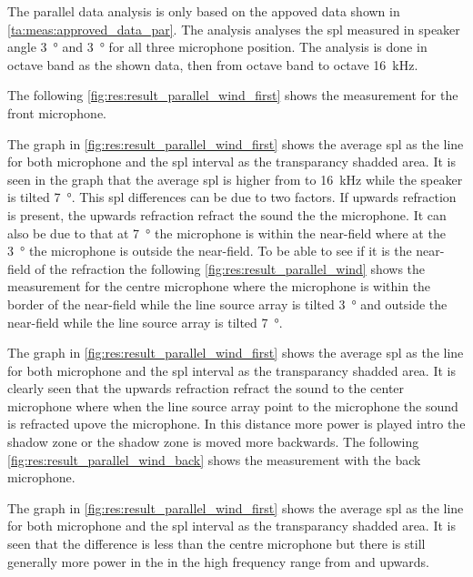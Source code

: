 The parallel data analysis is only based on the appoved data shown in \autoref{ta:meas:approved_data_par}. The analysis analyses the \gls{spl} measured in speaker angle \SI{3}{\degree} and  \SI{3}{\degree} for all three microphone position. The analysis is done in octave band as the shown data, then from octave band  to octave \SI{16}{\kilo\hertz}. 

 The following \autoref{fig:res:result_parallel_wind_first}  shows the measurement for the front microphone.

  
The graph in \autoref{fig:res:result_parallel_wind_first} shows the average \gls{spl} as the line for both microphone and the \gls{spl} interval as the transparancy shadded area.
It is seen in the graph that the average \gls{spl} is higher from  to \SI{16}{\kilo\hertz} while the speaker is tilted \SI{7}{\degree}. This \gls{spl} differences can be due to two factors. If upwards refraction is present, the upwards refraction refract the sound the the microphone. It can also be due to that at \SI{7}{\degree} the microphone is within the near-field where at the \SI{3}{\degree} the microphone is outside the near-field. To be able to see if it is the near-field of the refraction the following \autoref{fig:res:result_parallel_wind} shows the measurement for the centre microphone where the microphone is within the border of the near-field while the line source array is tilted \SI{3}{\degree} and outside the near-field while the line source array is tilted \SI{7}{\degree}.
 
  
  
 The graph in \autoref{fig:res:result_parallel_wind_first} shows the average \gls{spl} as the line for both microphone and the \gls{spl} interval as the transparancy shadded area. It is clearly seen that the upwards refraction refract the sound to the center microphone where when the line source array point to the microphone the sound is refracted upove the microphone. In this distance more power is played intro the shadow zone or the shadow zone is moved more backwards. The following \autoref{fig:res:result_parallel_wind_back} shows the measurement with the back microphone.
 
 
  
   
The graph in \autoref{fig:res:result_parallel_wind_first} shows the average \gls{spl} as the line for both microphone and the \gls{spl} interval as the transparancy shadded area. It is seen that the difference is less than the centre microphone but there is still generally more power in the in the high frequency range from  and upwards.   
   
